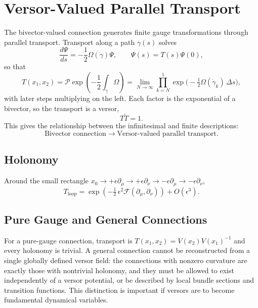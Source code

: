 \documentclass[11pt,a4paper]{article}
\newcommand{\F}{\mathcal{F}}
\newcommand{\Om}{\Omega}
\newcommand{\rev}[1]{\widetilde{#1}}
\begin{document}
\section{Versor-Valued Parallel Transport}
\label{sec:transport}

The bivector-valued connection generates finite gauge transformations
through parallel transport. Transport along a path \(\gamma(s)\)
solves
\[
    \frac{d\Psi}{ds}=-\frac12\Om(\dot\gamma)\Psi,
    \qquad
    \Psi(s)=T(s)\Psi(0),
\]
so that
\[
    \boxed{
        T(x_1,x_2)
        =
        \mathcal{P}
        \exp\left(
            -\frac{1}{2}
            \int_{\gamma}\Om
        \right)
        =
        \lim_{N\to\infty}\prod_{k=N}^{1}
        \exp\bigl(-\tfrac12\Om(\dot\gamma_k)\,\Delta s\bigr),
    }
\]
with later steps multiplying on the left. Each factor is the
exponential of a bivector, so the transport is a versor,
\[
    T\rev{T}=1 .
\]
This gives the relationship between the infinitesimal and finite
descriptions:
\[
    \boxed{
        \text{Bivector connection}
        \longrightarrow
        \text{Versor-valued parallel transport}.
    }
\]

\subsection{Holonomy}

Around the small rectangle
\(x_0\to+\epsilon\partial_\mu\to+\epsilon\partial_\nu\to
-\epsilon\partial_\mu\to-\epsilon\partial_\nu\),
\[
    \boxed{
        T_{\mathrm{loop}}
        =
        \exp\left(-\tfrac12\,\epsilon^2\F(\partial_\mu,\partial_\nu)\right)
        +O(\epsilon^3).
    }
\]

\subsection{Pure Gauge and General Connections}

For a pure-gauge connection, transport is
\(T(x_1,x_2)=V(x_2)V(x_1)^{-1}\) and every holonomy is trivial. A
general connection cannot be reconstructed from a single globally
defined versor field: the connections with nonzero curvature are
exactly those with nontrivial holonomy, and they must be allowed to
exist independently of a versor potential, or be described by local
bundle sections and transition functions. This distinction is
important if versors are to become fundamental dynamical variables.
\end{document}
